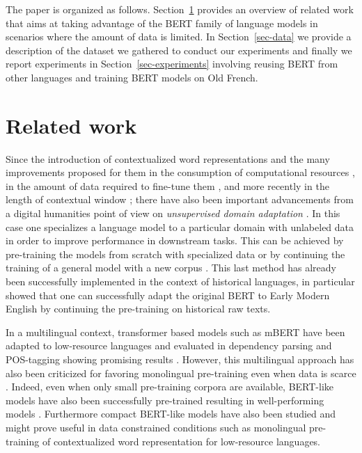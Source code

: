 The paper is organized as follows. Section~\ref{sec-related} provides an overview of related work that aims at taking advantage of the BERT family of language models in scenarios where the amount of data is limited. In Section~\ref{sec-data} we provide a description of the dataset we gathered to conduct our experiments and finally we report experiments in Section~\ref{sec-experiments} involving reusing BERT from other languages and training BERT models on Old French.

\section{Related work}
\label{sec-related}
Since the introduction of contextualized word representations \citep{peters-etal-2018-deep,akbik-etal-2018-contextual,devlin-etal-2019-bert} and the many improvements proposed for them in the consumption of computational resources \citep{clark-etal-2020-electra}, in the amount of data required to fine-tune them \citep{raffel-etal-2020-exploring}, and more recently in the length of contextual window \citep{xiong-etal-2021-nystromformer}; there have also been important advancements from a digital humanities point of view on \emph{unsupervised domain adaptation} \citep{ramponi-plank-2020-neural}. In this case one specializes a language model to a particular domain with unlabeled data in order to improve performance in downstream tasks. This can be achieved by  pre-training the models from scratch with specialized data \citep{beltagy-etal-2019-scibert} or by continuing the training of a general model with a new corpus \citep{lee2020BioBERTpre-trainedBiomedical, peng-etal-2019-transfer}. This last method has already been successfully implemented in the context of historical languages, in particular \citet{han-eisenstein-2019-unsupervised} showed that one can successfully adapt the original BERT \citep{devlin-etal-2019-bert} to Early Modern English by continuing the pre-training on historical raw texts.

In a multilingual context, transformer based models such as mBERT have been adapted to low-resource languages and evaluated in dependency parsing and POS-tagging showing promising results \citep{chau-etal-2020-parsing, muller2020WhenBeingUnseen, gururangan-etal-2020-dont, wang-etal-2020-extending}. However, this multilingual approach has also been criticized for favoring monolingual pre-training even when data is scarce \citep{virtanen2019MultilingualNotEnough, ortiz-suarez-etal-2020-monolingual}. Indeed, even when only small pre-training corpora are available, BERT-like models have also been successfully pre-trained resulting in well-performing models \citep{micheli-etal-2020-importance}. Furthermore compact BERT-like models have also been studied \citep{turc2019WellReadStudentsLearn} and might prove useful in data constrained conditions such as monolingual pre-training of contextualized word representation for low-resource languages.

